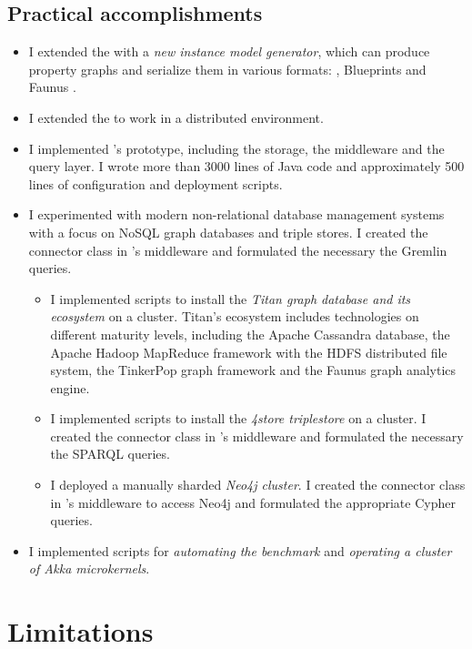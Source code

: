 \subsection{Practical accomplishments}

\begin{itemize}
  \item I extended the \tb{} with a \emph{new instance model generator}, which can produce property graphs and serialize them in various formats: \graphml{}, Blueprints \graphson{} and Faunus \graphson{}. %
  \item I extended the \tb{} to work in a distributed environment. 
  \item I implemented \iqd{}'s prototype, including the storage, the middleware and the query layer. I wrote more than 3000 lines of Java code and approximately 500 lines of configuration and deployment scripts.
  \item I experimented with modern non-relational database management systems with a focus on NoSQL graph databases and triple stores. I created the connector class in \iqd{}'s middleware and formulated the necessary the Gremlin queries.
  \begin{itemize}
    \item I implemented scripts to install the \emph{Titan graph database and its ecosystem} on a cluster. Titan's ecosystem includes technologies on different maturity levels, including the Apache Cassandra database, the Apache Hadoop MapReduce framework with the HDFS distributed file system, the TinkerPop graph framework and the Faunus graph analytics engine.
    \item I implemented scripts to install the \emph{4store triplestore} on a cluster. I created the connector class in \iqd{}'s middleware and formulated the necessary the SPARQL queries. 
    \item I deployed a manually sharded \emph{Neo4j cluster}. I created the connector class in \iqd{}'s middleware to access Neo4j and formulated the appropriate Cypher queries.
  \end{itemize}
  \item I implemented scripts for \emph{automating the benchmark} and \emph{operating a cluster of Akka microkernels}.
\end{itemize}

\section{Limitations}

